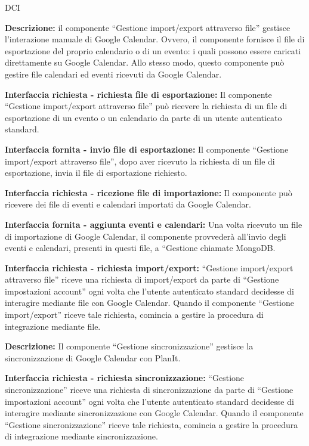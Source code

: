 \begin{listaPersonale}{DCI}

    \textbf{Descrizione:} il componente “Gestione import/export attraverso file” gestisce l'interazione manuale di Google Calendar. Ovvero, il componente fornisce il file di esportazione del proprio calendario o di un evento: i quali possono essere caricati direttamente su Google Calendar. Allo stesso modo, questo componente può gestire file calendari ed eventi ricevuti da Google Calendar.

    \textbf{Interfaccia richiesta - richiesta file di esportazione:} Il componente “Gestione import/export attraverso file” può ricevere la richiesta di un file di esportazione di un evento o un calendario da parte di un utente autenticato standard.

    \textbf{Interfaccia fornita - invio file di esportazione:} Il componente “Gestione import/export attraverso file”, dopo aver ricevuto la richiesta di un file di esportazione, invia il file di esportazione richiesto.

    \textbf{Interfaccia richiesta - ricezione file di importazione:} Il componente può ricevere dei file di eventi e calendari importati da Google Calendar.

    \textbf{Interfaccia fornita - aggiunta eventi e calendari:} Una volta ricevuto un file di importazione di Google Calendar, il componente provvederà all'invio degli eventi e calendari, presenti in questi file, a “Gestione chiamate MongoDB.

    \textbf{Interfaccia richiesta - richiesta import/export:} “Gestione import/export attraverso file” riceve una richiesta di import/export da parte di “Gestione impostazioni account” ogni volta che l'utente autenticato standard decidesse di interagire mediante file con Google Calendar. Quando il componente “Gestione import/export” riceve tale richiesta, comincia a gestire la procedura di integrazione mediante file.



    \textbf{Descrizione:}   Il componente “Gestione sincronizzazione” gestisce la sincronizzazione di Google Calendar con PlanIt.

    \textbf{Interfaccia richiesta - richiesta sincronizzazione:} “Gestione sincronizzazione” riceve una richiesta di sincronizzazione da parte di “Gestione impostazioni account” ogni volta che l'utente autenticato standard decidesse di interagire mediante sincronizzazione con Google Calendar. Quando il componente “Gestione sincronizzazione” riceve tale richiesta, comincia a gestire la procedura di integrazione mediante sincronizzazione.


\end{listaPersonale}
